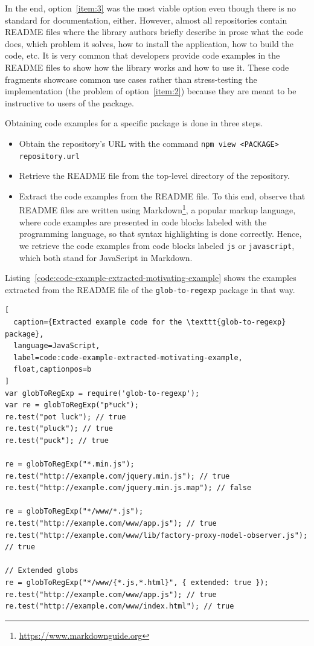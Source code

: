 \documentclass[english,cleveref,autoref,submission]{programming}
\newcommand{\coderef}[1]{Listing~\ref{#1}}
\begin{document}
In the end, option~\ref{item:3} was the most viable option even though there
is no standard for documentation, either. However, almost all repositories
contain README files where the library authors briefly describe in prose what
the code does, which problem it solves, how to install the
application, how to build the code, etc. It is very common that
developers provide code examples in the README files to show how the
library works and how to use it. These code fragments showcase common use cases rather
than stress-testing the implementation (the problem of
option~\ref{item:2}) because they are meant to be instructive to users of the package.  


Obtaining code examples for a specific \NPM{} package is done in three steps.
\begin{itemize}
\item Obtain the  repository's URL with the command
  \texttt{npm view <PACKAGE> repository.url}

\item Retrieve the README file from the top-level directory of the repository.

\item Extract the code examples from the README file. To this end,
  observe that README files are
  written using Markdown\footnote{\url{https://www.markdownguide.org}}, a
  popular markup language, where
  code examples are presented in code blocks labeled with the programming
  language, so that syntax highlighting is done correctly. Hence, we
  retrieve the code examples from code blocks labeled \texttt{js} or
  \texttt{javascript}, which both stand for JavaScript in
  Markdown.
\end{itemize}

\coderef{code:code-example-extracted-motivating-example} shows
the examples extracted from  the README file of the \texttt{glob-to-regexp} package in
that way.

\begin{lstlisting}[
  caption={Extracted example code for the \texttt{glob-to-regexp} package},
  language=JavaScript,
  label=code:code-example-extracted-motivating-example,
  float,captionpos=b
]
var globToRegExp = require('glob-to-regexp');
var re = globToRegExp("p*uck");
re.test("pot luck"); // true
re.test("pluck"); // true
re.test("puck"); // true

re = globToRegExp("*.min.js");
re.test("http://example.com/jquery.min.js"); // true
re.test("http://example.com/jquery.min.js.map"); // false

re = globToRegExp("*/www/*.js");
re.test("http://example.com/www/app.js"); // true
re.test("http://example.com/www/lib/factory-proxy-model-observer.js"); // true

// Extended globs
re = globToRegExp("*/www/{*.js,*.html}", { extended: true });
re.test("http://example.com/www/app.js"); // true
re.test("http://example.com/www/index.html"); // true
\end{lstlisting}
\end{document}
